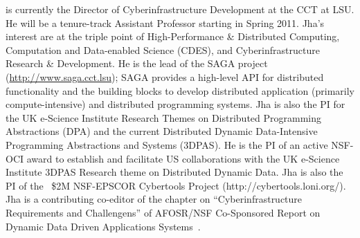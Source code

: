 \documentclass[12pt]{article}
\begin{document}
\newcommand{\squishlist}{
  \begin{list}{$\bullet$} { \setlength{\itemsep}{0pt}
      \setlength{\parsep}{3pt} \setlength{\topsep}{3pt}
      \setlength{\partopsep}{0pt} \setlength{\leftmargin}{1.5em}
      \setlength{\labelwidth}{1em} \setlength{\labelsep}{0.5em} } }

  \newcommand{\squishend}{
\end{list}  }
\vspace{-1.0in}

 is currently the Director of Cyberinfrastructure
Development at the CCT at LSU. He will be a tenure-track Assistant
Professor starting in Spring 2011. Jha's interest are at the triple
point of High-Performance \& Distributed Computing, Computation and
Data-enabled Science (CDES), and Cyberinfrastructure Research \& Development.
He is the lead of the SAGA project (\url{http://www.saga.cct.lsu});
SAGA provides a high-level API for distributed functionality and the
building blocks to develop distributed application (primarily
compute-intensive) and distributed programming systems. Jha is also
the PI for the UK e-Science Institute Research Themes on Distributed
Programming Abstractions (DPA) and the current Distributed Dynamic
Data-Intensive Programming Abstractions and Systems (3DPAS).  He is
the PI of an active NSF-OCI award to establish and facilitate US
collaborations with the UK e-Science Institute 3DPAS Research theme on
Distributed Dynamic Data. Jha is also the PI of the ~\$2M NSF-EPSCOR
Cybertools Project (http://cybertools.loni.org/). Jha is a
contributing co-editor of the chapter on ``Cyberinfrastructure
Requirements and Challengens'' of AFOSR/NSF Co-Sponsored Report on
Dynamic Data Driven Applications Systems~\cite{dddas}.
\end{document}
